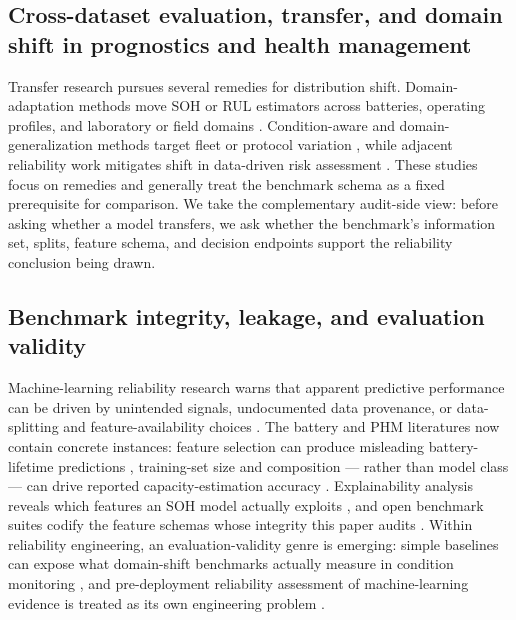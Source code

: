 \documentclass[
  number,
  preprint]{elsarticle}
\begin{document}
\subsection{Cross-dataset evaluation, transfer, and domain shift in
prognostics and health
management}\label{cross-dataset-evaluation-transfer-and-domain-shift-in-prognostics-and-health-management}

Transfer research pursues several remedies for distribution shift.
Domain-adaptation methods move SOH or RUL estimators across batteries,
operating profiles, and laboratory or field domains
\citep{ye2021domainadversarial, vilsen2022field, shen2024review, nejjar2024domain, nejjar2026uncertaintyguided, wang2026twostage}.
Condition-aware and domain-generalization methods target fleet or
protocol variation \citep{zhang2023multitask, fei2026decoupled}, while
adjacent reliability work mitigates shift in data-driven risk assessment
\citep{wang2025mitigating}. These studies focus on remedies and
generally treat the benchmark schema as a fixed prerequisite for
comparison. We take the complementary audit-side view: before asking
whether a model transfers, we ask whether the benchmark's information
set, splits, feature schema, and decision endpoints support the
reliability conclusion being drawn.

\subsection{Benchmark integrity, leakage, and evaluation
validity}\label{benchmark-integrity-leakage-and-evaluation-validity}

Machine-learning reliability research warns that apparent predictive
performance can be driven by unintended signals, undocumented data
provenance, or data-splitting and feature-availability choices
\citep{gebru2021datasheets, geirhos2020shortcut, kapoor2023leakage}. The
battery and PHM literatures now contain concrete instances: feature
selection can produce misleading battery-lifetime predictions
\citep{geslin2023selecting}, training-set size and composition ---
rather than model class --- can drive reported capacity-estimation
accuracy \citep{nagulapati2021capacity}. Explainability analysis reveals
which features an SOH model actually exploits
\citep{wang2023explainabilitydriven}, and open benchmark suites codify
the feature schemas whose integrity this paper audits
\citep{wang2024open}. Within reliability engineering, an
evaluation-validity genre is emerging: simple baselines can expose what
domain-shift benchmarks actually measure in condition monitoring
\citep{panic2027simple}, and pre-deployment reliability assessment of
machine-learning evidence is treated as its own engineering problem
\citep{chen2024evaluating}.
\end{document}
